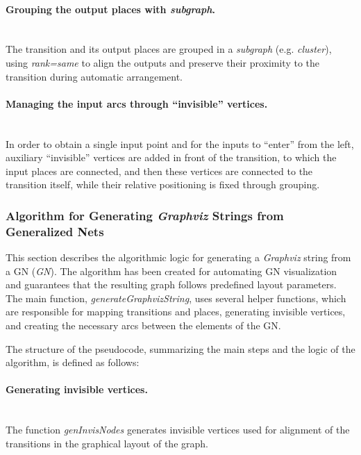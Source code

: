 \paragraph{Grouping the output places with \textit{subgraph}.}
\mbox{}\\
The transition and its output places are grouped in a \textit{subgraph} (e.g. \textit{cluster}), using \textit{rank=same} to align the outputs and preserve their proximity to the transition during automatic arrangement.

\paragraph{Managing the input arcs through ``invisible'' vertices.}
\mbox{}\\
In order to obtain a single input point and for the inputs to ``enter'' from the left, auxiliary ``invisible'' vertices are added in front of the transition, to which the input places are connected, and then these vertices are connected to the transition itself, while their relative positioning is fixed through grouping.


\subsubsection{Algorithm for Generating \textit{Graphviz} Strings from Generalized Nets}

\hspace*{2.5em}This section describes the algorithmic logic for generating a \textit{Graphviz} string from a GN (\textit{GN}). The algorithm has been created for automating GN visualization and guarantees that the resulting graph follows predefined layout parameters. The main function, \textit{generateGraphvizString}, uses several helper functions, which are responsible for mapping transitions and places, generating invisible vertices, and creating the necessary arcs between the elements of the GN.

The structure of the pseudocode, summarizing the main steps and the logic of the algorithm, is defined as follows:

\paragraph{Generating invisible vertices.}
\mbox{}\\
The function \textit{genInvisNodes} generates invisible vertices used for alignment of the transitions in the graphical layout of the graph.

